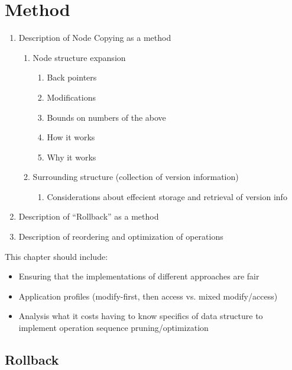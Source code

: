 \chapter{Method}

\begin{enumerate}
  \item Description of Node Copying as a method
  \begin{enumerate}
    \item Node structure expansion
    \begin{enumerate}
      \item Back pointers
      \item Modifications
      \item Bounds on numbers of the above
      \item How it works
      \item Why it works
    \end{enumerate}
    \item Surrounding structure (collection of version information)
    \begin{enumerate}
      \item Considerations about effecient storage and retrieval of version info
    \end{enumerate}
  \end{enumerate}
  \item Description of ``Rollback'' as a method
  \item Description of reordering and optimization of operations
\end{enumerate}



This chapter should include:
\begin{itemize}
  \item Ensuring that the implementations of different approaches are fair
  \item Application profiles (modify-first, then access vs. mixed modify/access)
  \item Analysis what it costs having to know specifics of data structure to
  implement operation sequence pruning/optimization
\end{itemize}

\section{Rollback}

